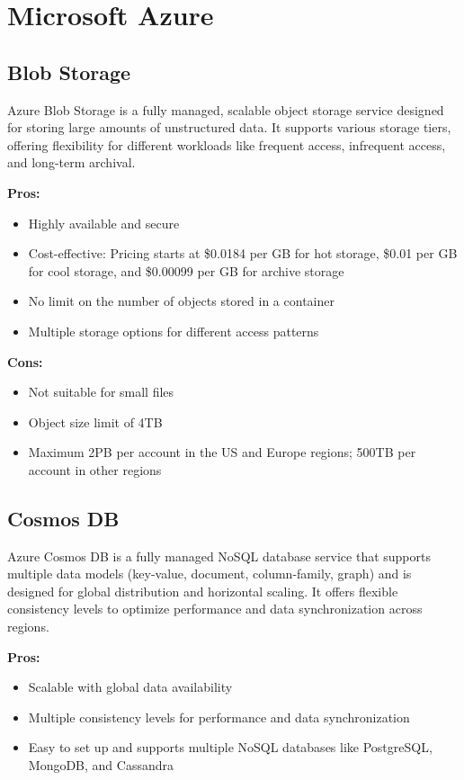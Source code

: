 \section{Microsoft Azure}
\label{azure}

\subsection*{Blob Storage}
\label{azure:blob-storage}
Azure Blob Storage is a fully managed, scalable object storage service designed for storing large amounts of unstructured data. It supports various storage tiers, offering flexibility for different workloads like frequent access, infrequent access, and long-term archival.

\textbf{Pros:}
\begin{itemize}
    \item Highly available and secure
    \item Cost-effective: Pricing starts at \$0.0184 per GB for hot storage, \$0.01 per GB for cool storage, and \$0.00099 per GB for archive storage
    \item No limit on the number of objects stored in a container
    \item Multiple storage options for different access patterns
\end{itemize}

\textbf{Cons:}
\begin{itemize}
    \item Not suitable for small files
    \item Object size limit of 4TB
    \item Maximum 2PB per account in the US and Europe regions; 500TB per account in other regions
\end{itemize}

\subsection*{Cosmos DB}
\label{azure:cosmos-db}
Azure Cosmos DB is a fully managed NoSQL database service that supports multiple data models (key-value, document, column-family, graph) and is designed for global distribution and horizontal scaling. It offers flexible consistency levels to optimize performance and data synchronization across regions.

\textbf{Pros:}
\begin{itemize}
    \item Scalable with global data availability
    \item Multiple consistency levels for performance and data synchronization
    \item Easy to set up and supports multiple NoSQL databases like PostgreSQL, MongoDB, and Cassandra
\end{itemize}

